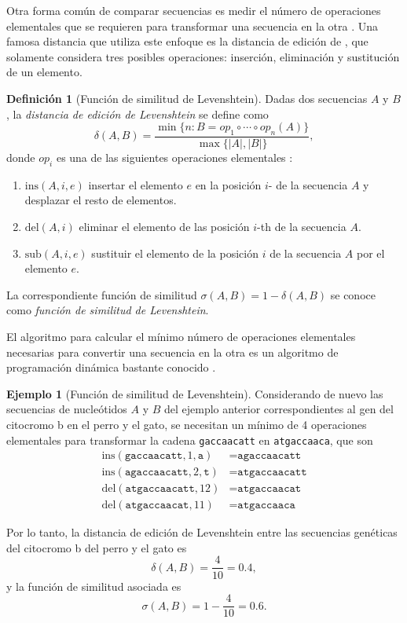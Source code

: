 \documentclass[a4paper,10pt,twoside]{article}
\theoremstyle{definition}
\newtheorem{definition}{Definición}
\newtheorem{example}{Ejemplo}
\begin{document}
Otra forma común de comparar secuencias es medir el número de operaciones elementales que se requieren para transformar una secuencia en la otra \cite{hahn1997knowledge}.
Una famosa distancia que utiliza este enfoque es la distancia de edición de \cite{levenshtein1966binary}, que solamente considera tres posibles operaciones: inserción, eliminación y sustitución de un elemento.

\begin{definition}[Función de similitud de Levenshtein]
Dadas dos secuencias $A$ y $B$, la \emph{distancia de edición de Levenshtein} se define como
\[
\delta(A,B)= \frac{\min\{n: B=op_1\circ\cdots\circ op_n(A)\}}{\max\{|A|,|B|\}},
\]
donde $op_i$ es una de las siguientes operaciones elementales :
\begin{enumerate}[label=--,noitemsep]
\item $\mbox{ins}(A,i,e)$ insertar el elemento $e$ en la posición $i$- de la secuencia $A$ y desplazar el resto de
elementos.
\item $\mbox{del}(A,i)$ eliminar el elemento de las posición $i$-th de la secuencia $A$.
\item $\mbox{sub}(A,i,e)$ sustituir el elemento de la posición $i$ de la secuencia $A$ por el elemento $e$.
\end{enumerate}

La correspondiente función de similitud $\sigma(A,B)=1-\delta(A,B)$ se conoce como \emph{función de similitud de Levenshtein}.
\end{definition}

El algoritmo para calcular el mínimo número de operaciones elementales necesarias para convertir una secuencia en la otra es un algoritmo de programación dinámica bastante conocido \cite{cormen2009introduction}.

\begin{example}[Función de similitud de Levenshtein]
Considerando de nuevo las secuencias de nucleótidos $A$ y $B$ del ejemplo anterior correspondientes al gen del citocromo b en el perro y el gato, se necesitan un mínimo de 4 operaciones elementales para transformar la cadena \texttt{gaccaacatt} en \texttt{atgaccaaca}, que son
\begin{align*}
\text{ins}(\texttt{gaccaacatt},1,\texttt{a}) &= \texttt{agaccaacatt}\\
\text{ins}(\texttt{agaccaacatt},2,\texttt{t}) &= \texttt{atgaccaacatt}\\
\text{del}(\texttt{atgaccaacatt},12) &= \texttt{atgaccaacat} \\
\text{del}(\texttt{atgaccaacat},11) &= \texttt{atgaccaaca}
\end{align*}

Por lo tanto, la distancia de edición de Levenshtein entre las secuencias genéticas del citocromo b del perro y el gato es
\[
\delta(A,B) = \frac{4}{10} = 0.4,
\]
y la función de similitud asociada es 
\[
\sigma(A,B) = 1-\frac{4}{10} = 0.6.
\]
\end{example}
\end{document}
